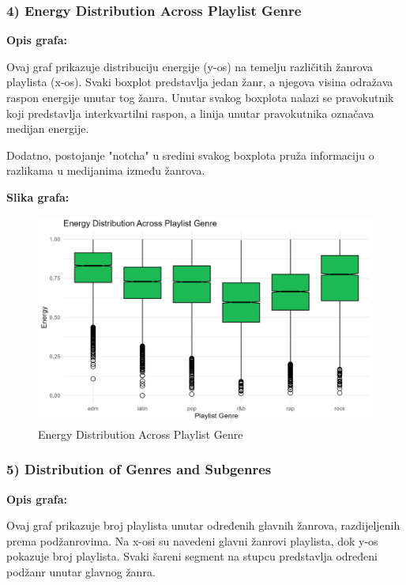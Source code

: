 		\subsubsection{4) Energy Distribution Across Playlist Genre}
	
	\textbf{Opis grafa:}
	
	Ovaj graf prikazuje distribuciju energije (y-os) na temelju različitih žanrova playlista (x-os). Svaki boxplot predstavlja jedan žanr, a njegova visina odražava raspon energije unutar tog žanra. Unutar svakog boxplota nalazi se pravokutnik koji predstavlja interkvartilni raspon, a linija unutar pravokutnika označava medijan energije.
	
	Dodatno, postojanje "notcha" u sredini svakog boxplota pruža informaciju o razlikama u medijanima između žanrova.
	
	
	\textbf{Slika grafa:}
	\begin{figure}[H]
		\includegraphics[scale=0.9]{slike/Genre-Energy.png}
		\centering
		\caption{Energy Distribution Across Playlist Genre}
		
	\end{figure}
	
		\subsubsection{5) Distribution of Genres and Subgenres}
	
	\textbf{Opis grafa:}
	
		Ovaj graf prikazuje broj playlista unutar određenih glavnih žanrova, razdijeljenih prema podžanrovima. Na x-osi su navedeni glavni žanrovi playlista, dok y-os pokazuje broj playlista. Svaki šareni segment na stupcu predstavlja određeni podžanr unutar glavnog žanra.
		
